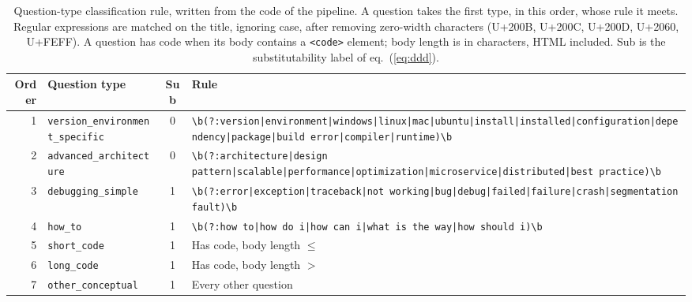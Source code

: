 \begin{table}[!htbp]
\centering
\caption{Question-type classification rule, written from the code of the pipeline. A question takes the first type, in this order, whose rule it meets. Regular expressions are matched on the title, ignoring case, after removing zero-width characters (U+200B, U+200C, U+200D, U+2060, U+FEFF). A question has code when its body contains a \texttt{<code>} element; body length is in characters, HTML included. Sub is the substitutability label of eq.~(\ref{eq:ddd}).}
\label{tab:classifier_rule}
\footnotesize
\begin{tabular}{rlcp{7.9cm}}
\toprule
Order & Question type & Sub & Rule \\
\midrule
1 & \texttt{version\_environment\_specific} & 0 & \texttt{\textbackslash{}b(?:version|\allowbreak{}environment|\allowbreak{}windows|\allowbreak{}linux|\allowbreak{}mac|\allowbreak{}ubuntu|\allowbreak{}install|\allowbreak{}installed|\allowbreak{}configuration|\allowbreak{}dependency|\allowbreak{}package|\allowbreak{}build error|\allowbreak{}compiler|\allowbreak{}runtime)\textbackslash{}b} \\
2 & \texttt{advanced\_architecture} & 0 & \texttt{\textbackslash{}b(?:architecture|\allowbreak{}design pattern|\allowbreak{}scalable|\allowbreak{}performance|\allowbreak{}optimization|\allowbreak{}microservice|\allowbreak{}distributed|\allowbreak{}best practice)\textbackslash{}b} \\
3 & \texttt{debugging\_simple} & 1 & \texttt{\textbackslash{}b(?:error|\allowbreak{}exception|\allowbreak{}traceback|\allowbreak{}not working|\allowbreak{}bug|\allowbreak{}debug|\allowbreak{}failed|\allowbreak{}failure|\allowbreak{}crash|\allowbreak{}segmentation fault)\textbackslash{}b} \\
4 & \texttt{how\_to} & 1 & \texttt{\textbackslash{}b(?:how to|\allowbreak{}how do i|\allowbreak{}how can i|\allowbreak{}what is the way|\allowbreak{}how should i)\textbackslash{}b} \\
5 & \texttt{short\_code} & 1 & Has code, body length $\leq$ \RClassBodyMax{} \\
6 & \texttt{long\_code} & 1 & Has code, body length $>$ \RClassBodyMax{} \\
7 & \texttt{other\_conceptual} & 1 & Every other question \\
\bottomrule
\end{tabular}
\end{table}
